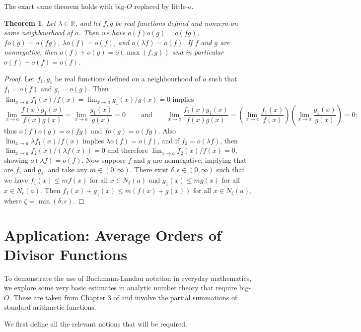 \documentclass{article}
\newtheorem{theorem}{Theorem}
\theoremstyle{definition}
\newcommand\RR{\mathbb R}
\begin{document}
The exact same theorem holds with big-$O$ replaced by little-$o$.

\begin{theorem}
    Let \(\lambda\in\RR\), and let \(f,g\) be real functions defined and nonzero on some neighbourhood of \(a\).
    Then we have \(o(f)o(g) = o(fg)\), \(fo(g) = o(fg)\), \(\lambda o(f) = o(f)\), and \(o(\lambda f) = o(f)\).
    If \(f\) and \(g\) are nonnegative, then \(o(f) + o(g) = o(\max(f, g))\) and in particular \(o(f) + o(f) = o(f)\).
\end{theorem}

\begin{proof}
    Let \(f_1,g_1\) be real functions defined on a neighbourhood of \(a\) such that \(f_1 = o(f)\) and \(g_1 = o(g)\).
    Then \(\lim_{x\to a} f_1(x)/f(x) = \lim_{x\to a} g_1(x)/g(x) = 0\) implies
    \[\lim_{x\to a} \frac{f(x)g_1(x)}{f(x)g(x)} = \lim_{x\to a} \frac{g_1(x)}{g(x)} = 0\ \qquad \text{and} \qquad \lim_{x\to a} \frac{f_1(x)g_1(x)}{f(x)g(x)} = \left(\lim_{x\to a} \frac{f_1(x)}{f(x)}\right) \left(\lim_{x\to a} \frac{g_1(x)}{g(x)}\right) = 0;\]
    thus \(o(f)o(g)=o(fg)\) and \(fo(g)=o(fg)\).
    Also \(\lim_{x\to a} \lambda f_1(x)/f(x)\) implies \(\lambda o(f) = o(f)\), and if \(f_2 = o(\lambda f)\), then \(\lim_{x\to a} f_2(x)/(\lambda f(x)) = 0\) and therefore \(\lim_{x\to a} f_2(x)/f(x) = 0\), showing \(o(\lambda f) = o(f)\).
    Now suppose \(f\) and \(g\) are nonnegative, implying that are \(f_1\) and \(g_1\), and take any \(m\in(0,\infty)\).
    There exist \(\delta,\epsilon\in(0,\infty)\) such that we have \(f_1(x) \le mf(x)\) for all \(x\in N_{\delta}(a)\) and \(g_1(x) \le mg(x)\) for all \(x\in N_{\epsilon}(a)\).
    Then \(f_1(x) + g_1(x) \le m(f(x) + g(x))\) for all \(x\in N_{\zeta}(a)\), where \(\zeta = \min(\delta,\epsilon)\).
\end{proof}

\section{Application: Average Orders of Divisor Functions}\label{sec:applications}

To demonstrate the use of Bachmann-Landau notation in everyday mathematics, we explore some very basic estimates in analytic number theory that require big-$O$.
These are taken from Chapter 3 of \cite{Apostol1976} and involve the partial summations of standard arithmetic functions.

We first define all the relevant notions that will be required.
\end{document}
